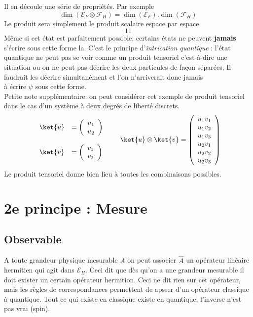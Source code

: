  Il en découle une série de propriétés. Par exemple
 \begin{equation}
 \dim(\mathcal{E}_F\otimes\mathcal{F}_H) = \dim(\mathcal{E}_F).
 \dim(\mathcal{F}_H)
 \end{equation}
 Le produit sera simplement le produit scalaire espace par espace
 \begin{equation}
 11
 \end{equation}
 Même si cet état est parfaitement possible, certains états ne peuvent 
 \textbf{jamais} s'écrire sous cette forme la. C'est le principe d'\textit{intrication 
 quantique }: l'état quantique ne peut pas se voir comme un produit 
 tensoriel c'est-à-dire une situation ou on ne peut pas décrire les deux particules 
 de façon séparées. Il faudrait les décrire simultanément et l'on n'arriverait donc jamais \\
 à écrire $\psi$ sous cette forme.\\
 
 Petite note supplémentaire: on peut considérer cet exemple de produit tensoriel dans 
 le cas d'un système à deux degrés de liberté discrets.
 \begin{equation}
 \begin{array}{ll}
 \ket{u} &= \left(\begin{array}{c}
 u_1\\
 u_2
 \end{array}\right)\\
 &\\
  \ket{v} &= \left(\begin{array}{c}
 v_1\\
 v_2
 \end{array}\right) 
 \end{array}\qquad \ket{u}\otimes\ket{v} = \left(\begin{array}{c}
 u_1v_1\\
 u_1v_2\\
 u_1v_3\\
 u_2v_1\\
 u_2v_2\\
 u_2v_3  
 \end{array}\right)
 \end{equation}
 Le produit tensoriel donne bien lieu à toutes les combinaisons possibles.
 
 
 \section{2e principe : Mesure}
 \subsection{Observable}
 A toute grandeur physique mesurable $A$ on peut associer $\hat{A}$ un 
 opérateur linéaire hermitien qui agit dans $\mathcal{E}_H$. Ceci dit 
 que dès qu'on a une grandeur mesurable il doit exister un certain opérateur
 hermition. Ceci ne dit rien sur cet opérateur, mais les règles de 
 correspondances permettent de apsser d'un opérateur classique à quantique. 
 Tout ce qui existe en classique existe en quantique, l'inverse n'est pas
 vrai (spin).
 
